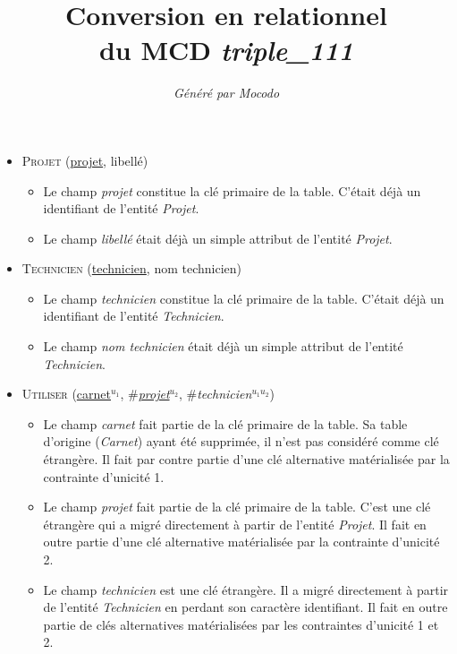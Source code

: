 \documentclass[a4paper]{article}
\title{Conversion en relationnel\\du MCD \emph{triple_111}}
\author{\emph{Généré par Mocodo}}
\newcommand{\relat}[1]{\textsc{#1}}
\newcommand{\attr}[1]{#1}
\newcommand{\prim}[1]{\uline{#1}}
\newcommand{\foreign}[1]{\#\textsl{#1}}
\begin{document}
\maketitle

\begin{itemize}
  \item \relat{Projet} (\prim{projet}, \attr{libellé})
  \begin{itemize}
    \item Le champ \emph{projet} constitue la clé primaire de la table. C'était déjà un identifiant de l'entité \emph{Projet}.
    \item Le champ \emph{libellé} était déjà un simple attribut de l'entité \emph{Projet}.
  \end{itemize}

  \item \relat{Technicien} (\prim{technicien}, \attr{nom technicien})
  \begin{itemize}
    \item Le champ \emph{technicien} constitue la clé primaire de la table. C'était déjà un identifiant de l'entité \emph{Technicien}.
    \item Le champ \emph{nom technicien} était déjà un simple attribut de l'entité \emph{Technicien}.
  \end{itemize}

  \item \relat{Utiliser} (\prim{carnet}$^{u_1}$, \foreign{\prim{projet}}$^{u_2}$, \foreign{technicien}$^{u_1 u_2}$)
  \begin{itemize}
    \item Le champ \emph{carnet} fait partie de la clé primaire de la table. Sa table d'origine (\emph{Carnet}) ayant été supprimée, il n'est pas considéré comme clé étrangère. Il fait par contre partie d'une clé alternative matérialisée par la contrainte d'unicité 1.
    \item Le champ \emph{projet} fait partie de la clé primaire de la table. C'est une clé étrangère qui a migré directement à partir de l'entité \emph{Projet}. Il fait en outre partie d'une clé alternative matérialisée par la contrainte d'unicité 2.
    \item Le champ \emph{technicien} est une clé étrangère. Il a migré directement à partir de l'entité \emph{Technicien} en perdant son caractère identifiant. Il fait en outre partie de clés alternatives matérialisées par les contraintes d'unicité 1 et 2.
  \end{itemize}

\end{itemize}
\end{document}
